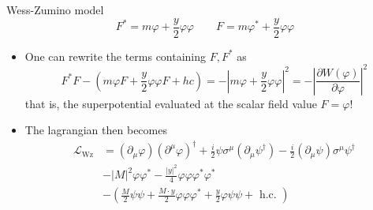 \documentclass[10pt]{beamer}
\begin{document}
\begin{frame}{Wess-Zumino model}
    \begin{equation*}
        F^{*} = m\varphi + \frac{y}{2}\varphi\varphi \qquad F = m \varphi^{*} + \frac{y}{2} \varphi \varphi
    \end{equation*}
    \begin{itemize}
        \item One can rewrite the terms containing $F, F^{*}$ as  
        \begin{equation*}
            F^{*} F-\left(m \varphi F+\frac{y}{2} \varphi \varphi F+h c\right)=-\left|m \varphi+\frac{y}{2} \varphi \varphi\right|^{2}=-\left|\frac{\partial W(\varphi)}{\partial \varphi}\right|^{2}
        \end{equation*}
        that is, the superpotential evaluated at the scalar field value $F = \varphi$!
        \item The lagrangian then becomes
        \begin{equation*}
            \begin{aligned}
                \mathcal{L}_{\mathrm{Wz}} &=\left(\partial_{\mu} \varphi\right)\left(\partial^{\mu} \varphi\right)^{\dagger}+\frac{i}{2} \psi \sigma^{\mu}\left(\partial_{\mu} \psi^{\dagger}\right)-\frac{i}{2}\left(\partial_{\mu} \psi\right) \sigma^{\mu} \psi^{\dagger} \\
                &-|M|^{2} \varphi \varphi^*-\frac{|y|^{2}}{4} \varphi \varphi \varphi^* \varphi^* \\
                &- \left(\frac{M}{2} \psi \psi+\frac{M \cdot y}{2} \varphi \varphi \varphi^*+\frac{y}{2} \varphi \psi \psi+\text { h.c. }\right)
                \end{aligned}
        \end{equation*}
        
        \end{itemize}
\end{frame}
\end{document}
